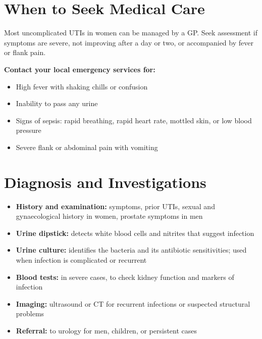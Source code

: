 \section*{When to Seek Medical Care}
Most uncomplicated UTIs in women can be managed by a GP. Seek assessment if symptoms are severe, not improving after a day or two, or accompanied by fever or flank pain.

\textbf{Contact your local emergency services for:}
\begin{itemize}
    \item High fever with shaking chills or confusion
    \item Inability to pass any urine
    \item Signs of sepsis: rapid breathing, rapid heart rate, mottled skin, or low blood pressure
    \item Severe flank or abdominal pain with vomiting
\end{itemize}

\section*{Diagnosis and Investigations}
\begin{itemize}
    \item \textbf{History and examination:} symptoms, prior UTIs, sexual and gynaecological history in women, prostate symptoms in men
    \item \textbf{Urine dipstick:} detects white blood cells and nitrites that suggest infection
    \item \textbf{Urine culture:} identifies the bacteria and its antibiotic sensitivities; used when infection is complicated or recurrent
    \item \textbf{Blood tests:} in severe cases, to check kidney function and markers of infection
    \item \textbf{Imaging:} ultrasound or CT for recurrent infections or suspected structural problems
    \item \textbf{Referral:} to urology for men, children, or persistent cases
\end{itemize}

